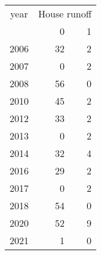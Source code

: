 \footnotesize\begin{tabular}[t]{lrr}
\toprule
\multicolumn{1}{c}{year} & \multicolumn{2}{c}{House runoff} \\
\cmidrule(l{3pt}r{3pt}){1-1} \cmidrule(l{3pt}r{3pt}){2-3}
  & 0 & 1\\
\midrule
2006 & 32 & 2\\
2007 & 0 & 2\\
2008 & 56 & 0\\
2010 & 45 & 2\\
2012 & 33 & 2\\
2013 & 0 & 2\\
2014 & 32 & 4\\
2016 & 29 & 2\\
2017 & 0 & 2\\
2018 & 54 & 0\\
2020 & 52 & 9\\
2021 & 1 & 0\\
\bottomrule
\end{tabular}
